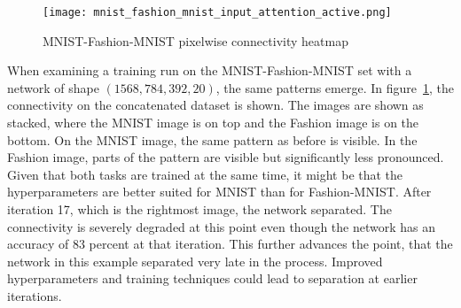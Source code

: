 \begin{figure}[ht] %
    \centering
    \texttt{[image: mnist\_fashion\_mnist\_input\_attention\_active.png]}
    \caption{MNIST-Fashion-MNIST pixelwise connectivity heatmap}\label{fig:mnist-fashion-map}
\end{figure}

When examining a training run on the MNIST-Fashion-MNIST set with a network of shape $(1568, 784, 392, 20)$, the same patterns emerge.
In figure~\ref{fig:mnist-fashion-map}, the connectivity on the concatenated dataset is shown.
The images are shown as stacked, where the MNIST image is on top and the Fashion image is on the bottom.
On the MNIST image, the same pattern as before is visible.
In the Fashion image, parts of the pattern are visible but significantly less pronounced.
Given that both tasks are trained at the same time, it might be that the hyperparameters are better suited for MNIST than for Fashion-{MNIST}.
After iteration 17, which is the rightmost image, the network separated.
The connectivity is severely degraded at this point even though the network has an accuracy of $83$ percent at that iteration.
This further advances the point, that the network in this example separated very late in the process.
Improved hyperparameters and training techniques could lead to separation at earlier iterations.